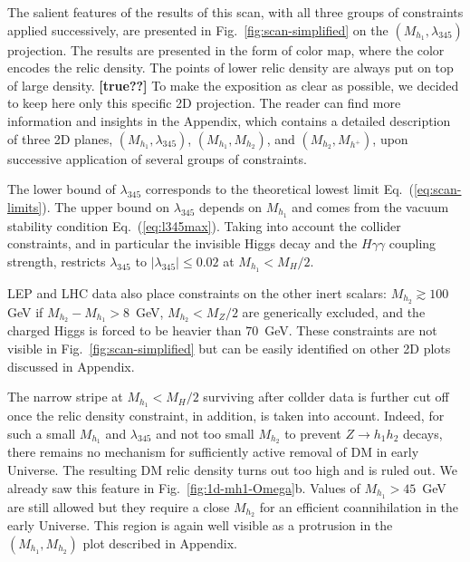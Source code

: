 \documentclass[12pt,a4paper]{article}
\newcommand {\blue} {\color{blue}}
\newcommand {\red} {\color{red}}
\begin{document}
{\blue The salient features of the results of this scan,
with all three groups of constraints applied successively, 
are presented in Fig.~\ref{fig:scan-simplified} on the $(M_{h_1},\lambda_{345})$ projection.
The results are presented in the form of color map, where the color encodes the relic density.
{\red The points of lower relic density are always put on top of large density. {\bf [true??]}} 
To make the exposition as clear as possible, we decided to keep here only this specific 2D projection. 
The reader can find more information and insights in the Appendix, which contains
a detailed description of three 2D planes, $(M_{h_1},\lambda_{345})$, $(M_{h_1},M_{h_2})$, and $(M_{h_2},M_{h^{+}})$,
upon successive application of several groups of constraints.

The lower bound of $\lambda_{345}$ corresponds to the theoretical lowest limit Eq.~(\ref{eq:scan-limits}).
The upper bound on $\lambda_{345}$ depends on $M_{h_1}$ and comes from 
the vacuum stability condition Eq.~(\ref{eq:l345max}). 
Taking into account the collider constraints, and in particular the invisible Higgs decay
and the $H\gamma\gamma$ coupling strength, restricts $\lambda_{345}$
to $|\lambda_{345}|\leq 0.02$ at $M_{h_1}<M_H/2$.

LEP and LHC data also place constraints on the other inert scalars: $M_{h_2}\gtrsim 100$ GeV if 
$M_{h_2}-M_{h_1}>8$~GeV, $M_{h_2} < M_Z/2$ are generically excluded, and 
the charged Higgs is forced to be heavier than $70$~GeV.
These constraints are not visible in Fig.~\ref{fig:scan-simplified} but can be easily identified
on other 2D plots discussed in Appendix.

The narrow stripe at $M_{h_1}<M_H/2$ surviving after collder data is further cut off once the relic density constraint, in addition,
is taken into account. Indeed, for such a small $M_{h_1}$ and $\lambda_{345}$
and not too small $M_{h_2}$ to prevent $Z \to h_1 h_2$ decays, 
there remains no mechanism for sufficiently active removal of DM 
in early Universe. The resulting DM relic density turns out too high and is ruled out. We already saw this feature 
in Fig.~\ref{fig:1d-mh1-Omega}b. Values of $M_{h_1} > 45$~GeV are still allowed but they require
a close $M_{h_2}$ for an efficient coannihilation in the early Universe.
This region is again well visible as a protrusion in the $(M_{h_1},M_{h_2})$ plot described in Appendix.

}
\end{document}
